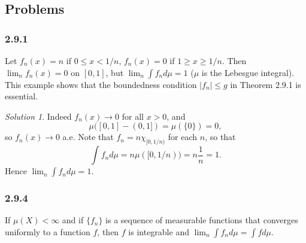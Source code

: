 \documentclass{report}
\theoremstyle{remark}
\newtheorem*{solution}{Solution}
\begin{document}
\subsection*{Problems}

\subsubsection*{2.9.1}
Let $f_n(x) = n$ if $0 \le x < 1/n$, $f_n(x) = 0$ if $1 \ge x \ge 1/n$. Then $\lim_n f_n(x) = 0$ on $[0,1]$, but $\lim_n \int f_n d\mu = 1$ ($\mu$ is the Lebesgue integral). This example shows that the boundedness condition $|f_n| \le g$ in Theorem 2.9.1 is essential.

\begin{solution}
  Indeed $f_n(x) \to 0$ for all $x > 0$, and
  \begin{equation*}
    \mu([0,1] - (0,1]) = \mu(\{0\}) = 0,
  \end{equation*}
  so $f_n(x) \to 0$ a.e. Note that $f_n = n \chi_{[0,1/n)}$ for each $n$, so that
  \begin{equation*}
    \int f_n d\mu = n \mu([0,1/n)) = n \frac{1}{n} = 1.
  \end{equation*}
  Hence $\lim_n \int f_n d\mu = 1$.
\end{solution}

\subsubsection*{2.9.4}
If $\mu(X) < \infty$ and if $\{f_n\}$ is a sequence of measurable functions that converges uniformly to a function $f$, then $f$ is integrable and $\lim_n \int f_n d\mu = \int f d\mu$.
\end{document}
